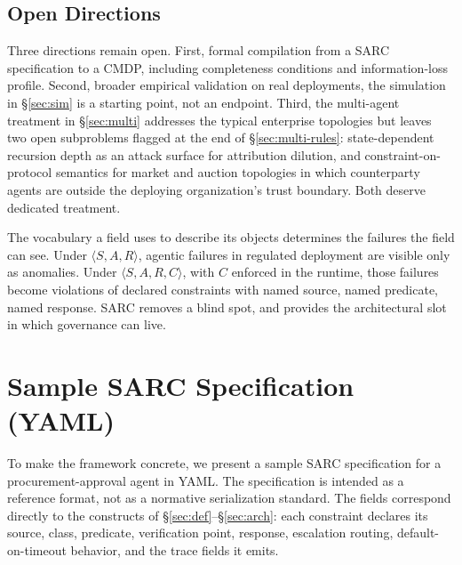 \documentclass[11pt,a4paper]{article}
\theoremstyle{remark}
\begin{document}
\subsection{Open Directions}

Three directions remain open. First, formal compilation from a SARC specification to a CMDP, including completeness conditions and information-loss profile. Second, broader empirical validation on real deployments, the simulation in \S\ref{sec:sim} is a starting point, not an endpoint. Third, the multi-agent treatment in \S\ref{sec:multi} addresses the typical enterprise topologies but leaves two open subproblems flagged at the end of \S\ref{sec:multi-rules}: state-dependent recursion depth as an attack surface for attribution dilution, and constraint-on-protocol semantics for market and auction topologies in which counterparty agents are outside the deploying organization's trust boundary. Both deserve dedicated treatment.

The vocabulary a field uses to describe its objects determines the failures the field can see. Under $\langle S, A, R \rangle$, agentic failures in regulated deployment are visible only as anomalies. Under $\langle S, A, R, C \rangle$, with $C$ enforced in the runtime, those failures become violations of declared constraints with named source, named predicate, named response. SARC removes a blind spot, and provides the architectural slot in which governance can live.

\appendix

\section{Sample SARC Specification (YAML)}\label{app:yaml}

To make the framework concrete, we present a sample SARC specification for a procurement-approval agent in YAML. The specification is intended as a reference format, not as a normative serialization standard. The fields correspond directly to the constructs of \S\ref{sec:def}--\S\ref{sec:arch}: each constraint declares its source, class, predicate, verification point, response, escalation routing, default-on-timeout behavior, and the trace fields it emits.
\end{document}
